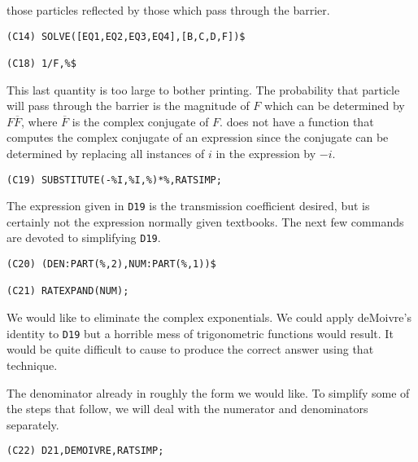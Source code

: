 those particles reflected by those which pass through the barrier.
\begin{verbatim}
(C14) SOLVE([EQ1,EQ2,EQ3,EQ4],[B,C,D,F])$

(C18) 1/F,%$
\end{verbatim}
This last quantity is too large to bother printing.  The probability
that particle will pass through the barrier is the magnitude of $F$
which can be determined by $F \overline{F}$, where $\overline{F}$ is the
complex conjugate of $F$.  {\Macsyma} does not have a  function that
computes the complex conjugate of an expression since the conjugate can
be determined by replacing all instances of $i$ in the expression by 
$-i$.  
\begin{verbatim}
(C19) SUBSTITUTE(-%I,%I,%)*%,RATSIMP;
\end{verbatim}

The expression given in {\tt D19} is the transmission coefficient desired,
but is certainly not the expression normally given textbooks.  The next few
commands are devoted to simplifying {\tt D19}.  
\begin{verbatim}
(C20) (DEN:PART(%,2),NUM:PART(%,1))$

(C21) RATEXPAND(NUM);
\end{verbatim}
We would like to eliminate the complex exponentials.  We could apply
deMoivre's identity to {\tt D19} but a horrible mess of trigonometric
functions would result.  It would be quite difficult to cause {\Macsyma} to
produce the correct answer using that technique.  

The denominator already in roughly the form we would like.  To simplify some
of the steps that follow, we will deal with the numerator and denominators
separately. 
\begin{verbatim}
(C22) D21,DEMOIVRE,RATSIMP;
\end{verbatim}

